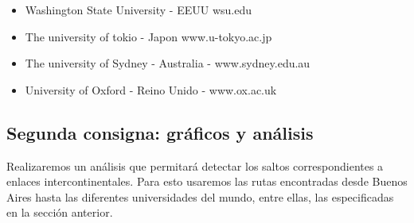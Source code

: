 \begin{itemize}
\item Washington State University - EEUU wsu.edu
\item The university of tokio - Japon www.u-tokyo.ac.jp
\item The university of Sydney - Australia - www.sydney.edu.au
\item University of Oxford - Reino Unido - www.ox.ac.uk

\end{itemize}

\subsection{Segunda consigna: gráficos y análisis}


Realizaremos un análisis que permitará detectar los saltos correspondientes a enlaces intercontinentales. Para esto usaremos las rutas encontradas desde Buenos Aires hasta las diferentes universidades del mundo, entre ellas, las especificadas en la sección anterior. 
